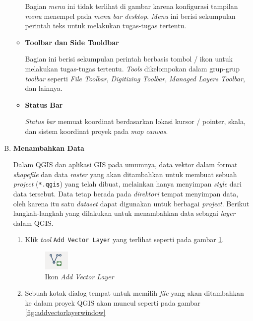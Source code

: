 \begin{enumerate}[A.]
\begin{itemize}
Bagian \textit{menu} ini tidak terlihat di gambar karena konfigurasi tampilan \textit{menu} menempel pada \textit{menu bar desktop}. \textit{Menu} ini berisi sekumpulan perintah teks untuk melakukan tugas-tugas tertentu.

\item \textbf{Toolbar dan Side Tooldbar}

Bagian ini berisi sekumpulan perintah berbasis tombol / ikon untuk melakukan tugas-tugas tertentu. \textit{Tools} dikelompokan dalam grup-grup \textit{toolbar} seperti \textit{File Toolbar}, \textit{Digitizing Toolbar}, \textit{Managed Layers Toolbar}, dan lainnya.

\item \textbf{Status Bar}

\textit{Status bar} memuat koordinat berdasarkan lokasi kursor / pointer, skala, dan sistem koordinat proyek pada \textit{map canvas}.

\end{itemize}

\item \textbf{Menambahkan Data}

Dalam QGIS dan aplikasi GIS pada umumnya, data vektor dalam format \textit{shapefile} dan data \textit{raster} yang akan ditambahkan untuk membuat sebuah \textit{project} (\texttt{*.qgis}) yang telah dibuat, melainkan hanya menyimpan \textit{style} dari data tersebut. Data tetap berada pada \textit{direktori} tempat menyimpan data, oleh karena itu satu \textit{dataset} dapat digunakan untuk berbagai \textit{project}. Berikut langkah-langkah yang dilakukan untuk menambahkan data sebagai \textit{layer} dalam QGIS.

\begin{enumerate}[1.]
  \item Klik \textit{tool} \texttt{Add Vector Layer} yang terlihat seperti pada gambar \ref{fig:addvectorlayer}.
  
\begin{figure}[H]
  \centering
  \includegraphics[scale=1]{./resources/005-ikon-add-vektor-layer}
  \caption{Ikon \textit{Add Vector Layer}}
  \label{fig:addvectorlayer}
\end{figure}

  \item Sebuah kotak dialog tempat untuk memilih \textit{file} yang akan ditambahkan ke dalam proyek QGIS akan muncul seperti pada gambar \ref{fig:addvectorlayerwindow}
  

\end{enumerate}
\end{enumerate}
